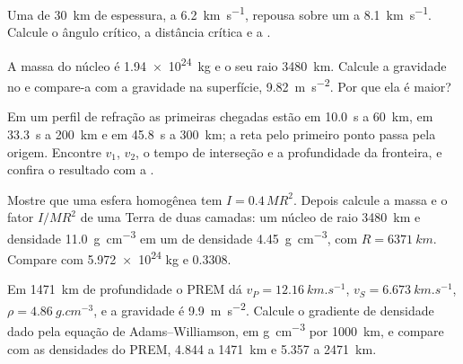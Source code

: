 \begin{exercise}[$\star$]\label{exo:b1:layered-earth:3}
Uma  de \qty{30}{km} de espessura, a \qty{6.2}{km.s^{-1}}, repousa sobre um  a
\qty{8.1}{km.s^{-1}}. Calcule o ângulo crítico, a distância crítica e a .
\end{exercise}

\begin{exercise}[$\star$]\label{exo:b1:layered-earth:4}
A massa do núcleo é \qty{1.94e24}{kg} e o seu raio \qty{3480}{km}. Calcule a gravidade no  e compare-a com a gravidade na superfície, \qty{9.82}{m.s^{-2}}. Por que ela é maior?
\end{exercise}

\begin{exercise}[$\star\star$]\label{exo:b1:layered-earth:5}
Em um perfil de refração as primeiras chegadas estão em \qty{10.0}{s} a \qty{60}{km}, em \qty{33.3}{s} a \qty{200}{km} e em \qty{45.8}{s} a \qty{300}{km}; a reta pelo primeiro ponto passa pela origem. Encontre $v_1$, $v_2$, o tempo de interseção e a profundidade da fronteira, e confira o resultado com a .
\end{exercise}

\begin{exercise}[$\star\star$]\label{exo:b1:layered-earth:6}
Mostre que uma esfera homogênea tem $I = 0.4\,MR^2$. Depois calcule a massa e o fator $I/MR^2$ de uma Terra de duas camadas: um núcleo de raio \qty{3480}{km} e densidade \qty{11.0}{g.cm^{-3}} em um  de densidade \qty{4.45}{g.cm^{-3}}, com $R = \qty{6371}{km}$. Compare com \num{5.972e24} kg e $0.3308$.
\end{exercise}

\begin{exercise}[$\star\star$]\label{exo:b1:layered-earth:7}
Em \qty{1471}{km} de profundidade o PREM dá $v_P = \qty{12.16}{km.s^{-1}}$,
$v_S = \qty{6.673}{km.s^{-1}}$, $\rho = \qty{4.86}{g.cm^{-3}}$, e a gravidade é \qty{9.9}{m.s^{-2}}. Calcule o gradiente de densidade dado pela equação de Adams--Williamson, em \unit{g.cm^{-3}} por \qty{1000}{km}, e compare com as densidades do PREM, \num{4.844} a \qty{1471}{km} e \num{5.357} a \qty{2471}{km}.
\end{exercise}

